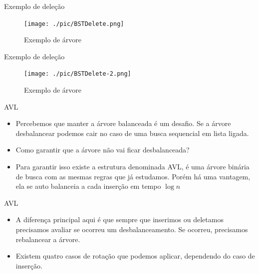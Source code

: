 \begin{frame}
	\begin{block}{Exemplo de deleção}
		\begin{figure}[!htb]
			\centering	  				
			\texttt{[image: ./pic/BSTDelete.png]}
			\caption{Exemplo de árvore \cite{GEEKS_2018}}
		\end{figure}
	\end{block}
\end{frame}

\begin{frame}
	\begin{block}{Exemplo de deleção}
		\begin{figure}[!htb]
			\centering	  				
			\texttt{[image: ./pic/BSTDelete-2.png]}
			\caption{Exemplo de árvore \cite{GEEKS_2018}}
		\end{figure}
	\end{block}
\end{frame}

\begin{frame}
	\begin{block}{AVL}
		\begin{itemize}
			\item Percebemos que manter a árvore balanceada é um desafio. Se a árvore desbalancear podemos cair no caso de uma busca sequencial em lista ligada.
			
			\item Como garantir que a árvore não vai ficar desbalanceada?
			
			\item Para garantir isso existe a estrutura denominada AVL, é uma árvore binária de busca com as mesmas regras que já estudamos. Porém há uma vantagem, ela se auto balanceia a cada inserção em tempo $\log n$
		\end{itemize}
	\end{block}
\end{frame}


\begin{frame}
	\begin{block}{AVL}
		\begin{itemize}
			\item A diferença principal aqui é que sempre que inserimos ou deletamos precisamos avaliar se ocorreu um desbalanceamento. Se ocorreu, precisamos rebalancear a árvore.

			\item Existem quatro casos de rotação que podemos aplicar, dependendo do caso de inserção.
		\end{itemize}
	\end{block}
\end{frame}

